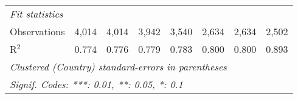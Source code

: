 \begin{tabular}{lccccccc}
   \midrule \emph{Fit statistics}\\
   Observations                                                     & 4,014         & 4,014        & 3,942         & 3,540        & 2,634         & 2,634         & 2,502\\  
   R$^2$                                                            & 0.774         & 0.776        & 0.779         & 0.783        & 0.800         & 0.800         & 0.893\\  
   \midrule
   \multicolumn{8}{l}{\emph{Clustered (Country) standard-errors in parentheses}}\\
   \multicolumn{8}{l}{\emph{Signif. Codes: ***: 0.01, **: 0.05, *: 0.1}}\\
\end{tabular}
\par\endgroup


